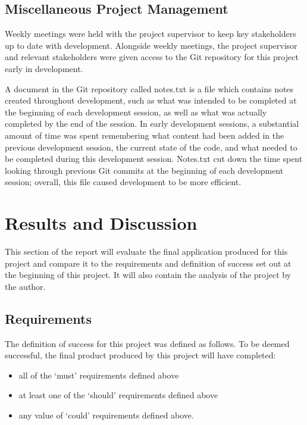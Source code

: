 \documentclass{article}
\begin{document}
\subsection{Miscellaneous Project Management}

Weekly meetings were held with the project supervisor to keep key stakeholders up to date with development. Alongside weekly meetings, the project supervisor and relevant stakeholders were given access to the Git repository for this project early in development. \par

A document in the Git repository called notes.txt is a file which contains notes created throughout development, such as what was intended to be completed at the beginning of each development session, as well as what was actually completed by the end of the session. In early development sessions, a substantial amount of time was spent remembering what content had been added in the previous development session, the current state of the code, and what needed to be completed during this development session. Notes.txt cut down the time spent looking through previous Git commits at the beginning of each development session; overall, this file caused development to be more efficient. \par

\section{Results and Discussion}
\label{section:results}

This section of the report will evaluate the final application produced for this project and compare it to the requirements and definition of success set out at the beginning of this project. It will also contain the analysis of the project by the author. 

\subsection{Requirements}

The definition of success for this project was defined as follows. To be deemed successful, the final product produced by this project will have completed: 

\begin{itemize}
	\item all of the `must' requirements defined above
	\item at least one of the `should' requirements defined above
	\item any value of `could' requirements defined above.
\end{itemize}
\end{document}
